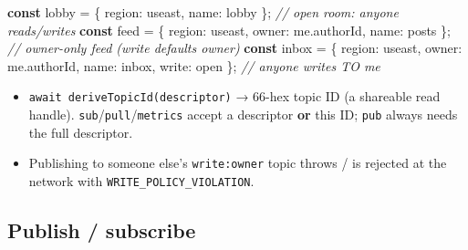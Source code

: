 \documentclass[
  nobib]{tufte-handout}
\newenvironment{Shaded}{}{}
\newcommand{\AttributeTok}[1]{\textcolor[rgb]{0.49,0.56,0.16}{#1}}
\newcommand{\CommentTok}[1]{\textcolor[rgb]{0.38,0.63,0.69}{\textit{#1}}}
\newcommand{\DataTypeTok}[1]{\textcolor[rgb]{0.56,0.13,0.00}{#1}}
\newcommand{\KeywordTok}[1]{\textcolor[rgb]{0.00,0.44,0.13}{\textbf{#1}}}
\newcommand{\NormalTok}[1]{#1}
\newcommand{\OperatorTok}[1]{\textcolor[rgb]{0.40,0.40,0.40}{#1}}
\newcommand{\StringTok}[1]{\textcolor[rgb]{0.25,0.44,0.63}{#1}}
\providecommand{\tightlist}{%
  \setlength{\itemsep}{0pt}\setlength{\parskip}{0pt}}
\begin{document}
\begin{Shaded}
\begin{Highlighting}[]
\KeywordTok{const}\NormalTok{ lobby }\OperatorTok{=}\NormalTok{ \{ }\DataTypeTok{region}\OperatorTok{:} \StringTok{\textquotesingle{}useast\textquotesingle{}}\OperatorTok{,} \DataTypeTok{name}\OperatorTok{:} \StringTok{\textquotesingle{}lobby\textquotesingle{}}\NormalTok{ \}}\OperatorTok{;}                       \CommentTok{// open room: anyone reads/writes}
\KeywordTok{const}\NormalTok{ feed  }\OperatorTok{=}\NormalTok{ \{ }\DataTypeTok{region}\OperatorTok{:} \StringTok{\textquotesingle{}useast\textquotesingle{}}\OperatorTok{,} \DataTypeTok{owner}\OperatorTok{:}\NormalTok{ me}\OperatorTok{.}\AttributeTok{authorId}\OperatorTok{,} \DataTypeTok{name}\OperatorTok{:} \StringTok{\textquotesingle{}posts\textquotesingle{}}\NormalTok{ \}}\OperatorTok{;}  \CommentTok{// owner{-}only feed (write defaults \textquotesingle{}owner\textquotesingle{})}
\KeywordTok{const}\NormalTok{ inbox }\OperatorTok{=}\NormalTok{ \{ }\DataTypeTok{region}\OperatorTok{:} \StringTok{\textquotesingle{}useast\textquotesingle{}}\OperatorTok{,} \DataTypeTok{owner}\OperatorTok{:}\NormalTok{ me}\OperatorTok{.}\AttributeTok{authorId}\OperatorTok{,} \DataTypeTok{name}\OperatorTok{:} \StringTok{\textquotesingle{}inbox\textquotesingle{}}\OperatorTok{,} \DataTypeTok{write}\OperatorTok{:} \StringTok{\textquotesingle{}open\textquotesingle{}}\NormalTok{ \}}\OperatorTok{;} \CommentTok{// anyone writes TO me}
\end{Highlighting}
\end{Shaded}

\begin{itemize}
\tightlist
\item
  \texttt{await\ deriveTopicId(descriptor)} → 66-hex topic ID (a
  shareable read handle). \texttt{sub}/\texttt{pull}/\texttt{metrics}
  accept a descriptor \textbf{or} this ID; \texttt{pub} always needs the
  full descriptor.
\item
  Publishing to someone else's
  \texttt{write:\textquotesingle{}owner\textquotesingle{}} topic throws
  / is rejected at the network with \texttt{WRITE\_POLICY\_VIOLATION}.
\end{itemize}

\subsection{Publish / subscribe}\label{publish-subscribe}
\end{document}
